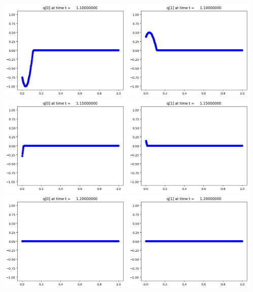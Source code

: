 \documentclass[11pt]{article}
\begin{document}
\vskip 10pt 
\includegraphics[width=0.475\textwidth]{frame0022fig0.png}
\includegraphics[width=0.475\textwidth]{frame0022fig1.png}
\vskip 10pt 
\includegraphics[width=0.475\textwidth]{frame0023fig0.png}
\includegraphics[width=0.475\textwidth]{frame0023fig1.png}
\vskip 10pt 
\includegraphics[width=0.475\textwidth]{frame0024fig0.png}
\includegraphics[width=0.475\textwidth]{frame0024fig1.png}
\end{document}

